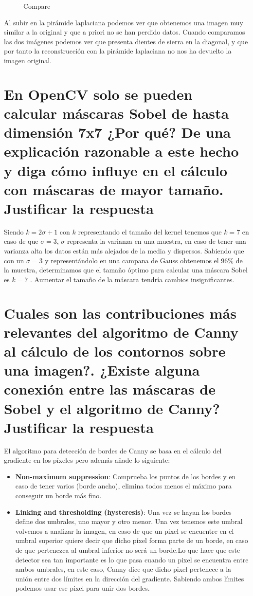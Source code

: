 \documentclass{article}
\begin{document}
\begin{figure}[h]
\begin{minipage}[b]{0.3\linewidth}
\caption{Compare}
\end{minipage}
\end{figure}

Al subir en la pirámide laplaciana podemos ver que obtenemos una imagen muy similar a la original y que a priori no se han perdido datos. Cuando comparamos las dos imágenes podemos ver que presenta dientes de sierra en la diagonal, y que por tanto la reconstrucción con la pirámide laplaciana no nos ha devuelto la imagen original.

\section{En OpenCV solo se pueden calcular máscaras Sobel de hasta dimensión 7x7 ¿Por qué? De una explicación razonable a este hecho y diga cómo influye en el cálculo con máscaras de mayor tamaño. Justificar la respuesta}
Siendo $k = 2\sigma + 1$ con $k$ representando el tamaño del kernel tenemos que $k = 7$ en caso de que $\sigma = 3$, $\sigma$ representa la varianza en una muestra, en caso de tener una varianza alta los datos están más alejados de la media y dispersos. Sabiendo que con un $\sigma = 3$ y representándolo en una campana de Gauss obtenemos el 96\% de la muestra, determinamos que el tamaño óptimo para calcular una máscara Sobel es $k = 7$ . Aumentar el tamaño de la máscara tendría cambios insignificantes. 

\section{Cuales son las contribuciones más relevantes del algoritmo de Canny al cálculo de los contornos sobre una imagen?. ¿Existe alguna conexión entre las máscaras de Sobel y el algoritmo de Canny? Justificar la respuesta}
El algoritmo para detección de bordes de Canny se basa en el cálculo del gradiente en los píxeles pero además añade lo siguiente:
\begin{itemize}
\item \textbf{Non-maximum suppression}: Comprueba los puntos de los bordes y en caso de tener varios (borde ancho), elimina todos menos el máximo para conseguir un borde más fino.
\item \textbf{Linking and thresholding (hysteresis)}: Una vez se hayan los bordes define dos umbrales, uno mayor y otro menor. Una vez tenemos este umbral volvemos a analizar la imagen, en caso de que un pixel se encuentre en el umbral superior quiere decir que dicho píxel forma parte de un borde, en caso de que pertenezca al umbral inferior no será un borde.Lo que hace que este detector sea tan importante es lo que pasa cuando un pixel se encuentra entre ambos umbrales, en este caso, Canny dice que dicho pixel pertenece a la unión entre dos límites en la dirección del gradiente. Sabiendo ambos límites podemos usar ese pixel para unir dos bordes.
\end{itemize}
\end{document}

